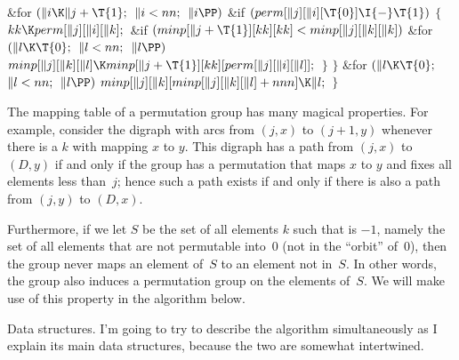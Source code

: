 \&{for} ${}(\|i\K\|j+\T{1};{}$ ${}\|i<\\{nn};{}$ ${}\|i\PP){}$\1\6
\&{if} ${}(\\{perm}[\|j][\|i][\T{0}]\I{-}\T{1}){}$\5
${}\{{}$\1\6
${}\\{kk}\K\\{perm}[\|j][\|i][\|k];{}$\6
\&{if} ${}(\\{minp}[\|j+\T{1}][\\{kk}][\\{kk}]<\\{minp}[\|j][\|k][\|k]){}$\1\6
\&{for} ${}(\|l\K\T{0};{}$ ${}\|l<\\{nn};{}$ ${}\|l\PP){}$\1\5
${}\\{minp}[\|j][\|k][\|l]\K\\{minp}[\|j+\T{1}][\\{kk}][\\{perm}[\|j][\|i][%
\|l]];{}$\2\2\6
\4${}\}{}$\2\2\6
\4${}\}{}$\2\6
\&{for} ${}(\|l\K\T{0};{}$ ${}\|l<\\{nn};{}$ ${}\|l\PP){}$\1\5
${}\\{minp}[\|j][\|k][\\{minp}[\|j][\|k][\|l]+\\{nnn}]\K\|l;{}$\2\6
\4${}\}{}$\2\2\par
\fi

The mapping table of a permutation group has many
magical properties.
For example, consider the digraph with arcs from $(j,x)$ to $(j+1,y)$
whenever there is a $k$ with  mapping $x$ to $y$.
This digraph has a path from $(j,x)$ to $(D,y)$ if and only if
the group has a permutation that maps $x$ to $y$ and fixes all elements
less than~$j$; hence such a path exists if and only if there is also a path
from $(j,y)$ to $(D,x)$.

Furthermore, if we let $S$ be the set of all elements $k$ such that
is $-1$, namely the set of all elements that are not permutable into~0
(not in the ``orbit'' of~0), then the group never maps an element of~$S$
to an element not in~$S$. In other words, the group also induces a
permutation group on the elements of~$S$. We will make use of this
property in the algorithm below.

\fi

Data structures. I'm going to try to describe the
algorithm
simultaneously as I explain its main data structures, because the
two are somewhat intertwined.

